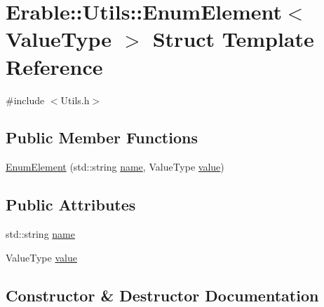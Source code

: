 \hypertarget{struct_erable_1_1_utils_1_1_enum_element}{}\section{Erable\+::Utils\+::Enum\+Element$<$ Value\+Type $>$ Struct Template Reference}
\label{struct_erable_1_1_utils_1_1_enum_element}


{\ttfamily \#include $<$Utils.\+h$>$}

\subsection*{Public Member Functions}
\begin{DoxyCompactItemize}
\item 
\mbox{\hyperlink{struct_erable_1_1_utils_1_1_enum_element_a6e7cdb4db25ab122083ff5fed6ea10ab}{Enum\+Element}} (std\+::string \mbox{\hyperlink{struct_erable_1_1_utils_1_1_enum_element_a1b5ca282ac97cac35ba1919d03168b80}{name}}, Value\+Type \mbox{\hyperlink{struct_erable_1_1_utils_1_1_enum_element_a8f6e0533bacee39dfe1a1231139a857c}{value}})
\end{DoxyCompactItemize}
\subsection*{Public Attributes}
\begin{DoxyCompactItemize}
\item 
std\+::string \mbox{\hyperlink{struct_erable_1_1_utils_1_1_enum_element_a1b5ca282ac97cac35ba1919d03168b80}{name}}
\item 
Value\+Type \mbox{\hyperlink{struct_erable_1_1_utils_1_1_enum_element_a8f6e0533bacee39dfe1a1231139a857c}{value}}
\end{DoxyCompactItemize}


\subsection{Constructor \& Destructor Documentation}
\mbox{\label{struct_erable_1_1_utils_1_1_enum_element_a6e7cdb4db25ab122083ff5fed6ea10ab}} 
